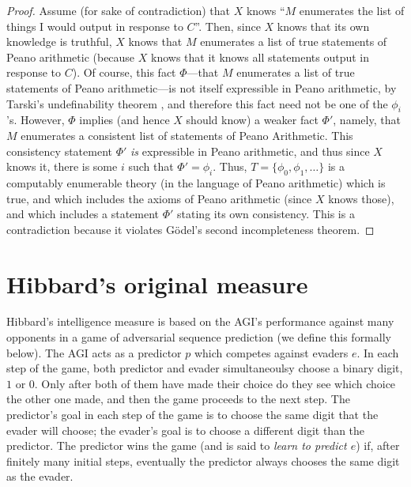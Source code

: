 \documentclass{article}
\begin{document}
\begin{proof}
    Assume (for sake of contradiction) that $X$ knows ``$M$ enumerates the
    list of things I would output in response to $C$''.
    Then, since $X$ knows that its own knowledge is truthful,
    $X$ knows that $M$ enumerates a list of true statements of Peano arithmetic
    (because $X$ knows that it knows all statements output in response to $C$).
    Of course, this fact $\Phi$---that $M$ enumerates a list of true statements of Peano
    arithmetic---is not itself expressible in Peano arithmetic, by Tarski's
    undefinability theorem \cite{tarski1936wahrheitsbegriff},
    and therefore this fact need not be one of the $\phi_i$'s.
    However, $\Phi$ implies (and hence $X$ should know)
    a weaker fact $\Phi'$, namely, that $M$ enumerates a consistent
    list of statements of Peano Arithmetic. This consistency statement $\Phi'$ \emph{is}
    expressible in Peano arithmetic, and thus since $X$ knows it,
    there is some $i$ such that $\Phi'=\phi_i$. Thus, $T=\{\phi_0,\phi_1,\ldots\}$
    is a computably enumerable
    theory (in the language of Peano arithmetic) which is true, and which
    includes the axioms of Peano arithmetic (since $X$ knows those), and which
    includes a statement $\Phi'$ stating its own consistency. This is a contradiction
    because it violates G\"odel's second incompleteness theorem.
\end{proof}

\section{Hibbard's original measure}
\label{originalmeasuresection}

Hibbard's intelligence measure is based on the AGI's performance against
many opponents in a game of adversarial sequence prediction (we define this
formally below). The AGI acts as
a predictor $p$ which competes against evaders $e$. In each step of the game,
both predictor and evader simultaneoulsy choose a binary digit, $1$ or $0$.
Only after both of them have made their choice do they see which choice the other
one made, and then the game proceeds to the next step. The predictor's goal in
each step of the game is to choose the same digit that the evader will choose;
the evader's goal is to choose a different digit than the predictor. The predictor
wins the game (and is said to \emph{learn to predict $e$}) if, after finitely many
initial steps, eventually the predictor always chooses the same digit as the
evader.
\end{document}
